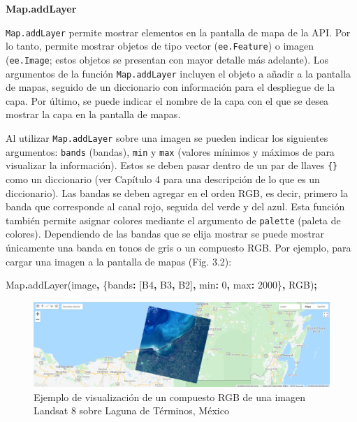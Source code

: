 \documentclass[
  12pt,
  letterpaper,
  twoside]{book}
\newenvironment{Shaded}{\begin{snugshade}}{\end{snugshade}}
\newcommand{\BuiltInTok}[1]{#1}
\newcommand{\DataTypeTok}[1]{\textcolor[rgb]{0.13,0.29,0.53}{#1}}
\newcommand{\DecValTok}[1]{\textcolor[rgb]{0.00,0.00,0.81}{#1}}
\newcommand{\FunctionTok}[1]{\textcolor[rgb]{0.00,0.00,0.00}{#1}}
\newcommand{\NormalTok}[1]{#1}
\newcommand{\OperatorTok}[1]{\textcolor[rgb]{0.81,0.36,0.00}{\textbf{#1}}}
\newcommand{\StringTok}[1]{\textcolor[rgb]{0.31,0.60,0.02}{#1}}
\begin{document}
\textbf{Map.addLayer}

\texttt{Map.addLayer} permite mostrar elementos en la pantalla de mapa de la API. Por lo tanto, permite mostrar objetos de tipo vector (\texttt{ee.Feature}) o imagen (\texttt{ee.Image}; estos objetos se presentan con mayor detalle más adelante). Los argumentos de la función \texttt{Map.addLayer} incluyen el objeto a añadir a la pantalla de mapas, seguido de un diccionario con información para el despliegue de la capa. Por último, se puede indicar el nombre de la capa con el que se desea mostrar la capa en la pantalla de mapas.

Al utilizar \texttt{Map.addLayer} sobre una imagen se pueden indicar los siguientes argumentos: \texttt{bands} (bandas), \texttt{min} y \texttt{max} (valores mínimos y máximos de para visualizar la información). Estos se deben pasar dentro de un par de llaves \texttt{\{\}} como un diccionario (ver Capítulo 4 para una descripción de lo que es un diccionario). Las bandas se deben agregar en el orden RGB, es decir, primero la banda que corresponde al canal rojo, seguida del verde y del azul. Esta función también permite asignar colores mediante el argumento de \texttt{palette} (paleta de colores). Dependiendo de las bandas que se elija mostrar se puede mostrar únicamente una banda en tonos de gris o un compuesto RGB. Por ejemplo, para cargar una imagen a la pantalla de mapas (Fig. 3.2):

\begin{Shaded}
\begin{Highlighting}[]
\BuiltInTok{Map}\OperatorTok{.}\FunctionTok{addLayer}\NormalTok{(image}\OperatorTok{,}\NormalTok{ \{}\DataTypeTok{bands}\OperatorTok{:}\NormalTok{ [}\StringTok{\textquotesingle{}B4\textquotesingle{}}\OperatorTok{,} \StringTok{\textquotesingle{}B3\textquotesingle{}}\OperatorTok{,} \StringTok{\textquotesingle{}B2\textquotesingle{}}\NormalTok{]}\OperatorTok{,} 
                      \DataTypeTok{min}\OperatorTok{:} \DecValTok{0}\OperatorTok{,} \DataTypeTok{max}\OperatorTok{:} \DecValTok{2000}\NormalTok{\}}\OperatorTok{,} 
                      \StringTok{\textquotesingle{}RGB\textquotesingle{}}\NormalTok{)}\OperatorTok{;}
\end{Highlighting}
\end{Shaded}

\begin{figure}[btp]

{\centering \includegraphics[width=1\linewidth]{Img/LTerminos} 

}

\caption{Ejemplo de visualización de un compuesto RGB de una imagen Landsat 8 sobre Laguna de Términos, México}\label{fig:unnamed-chunk-27}
\end{figure}
\end{document}
